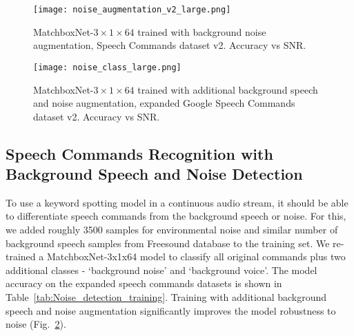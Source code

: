 \documentclass[a4paper]{article}
\begin{document}
\begin{figure}[ht!]
  \centering
  \texttt{[image: noise\_augmentation\_v2\_large.png]}
  \caption{MatchboxNet-$3\times1\times64$ trained with background noise augmentation, Speech Commands dataset v2. Accuracy vs SNR.}
  \label{fig:noise_augmentation_eval_v2}
\end{figure}

\begin{figure}[ht!]
  \centering
  \texttt{[image: noise\_class\_large.png]}
  \caption{MatchboxNet-$3\times1\times64$ trained with additional background speech and noise augmentation, expanded Google Speech Commands dataset v2. Accuracy vs SNR.}
  \label{fig:noise_detection_eval}
\end{figure}

\subsection{Speech Commands Recognition with Background Speech and Noise Detection}

To use a keyword spotting model in a continuous audio stream, it should be able to differentiate speech commands from the background speech or noise. For this,  we added roughly 3500 samples for environmental noise  and similar number of  background speech samples from Freesound database to the training set. We re-trained a MatchboxNet-3x1x64 model to classify all  original commands plus two additional classes - `background noise' and `background voice'. The model accuracy on the expanded speech commands datasets is shown in Table~\ref{tab:Noise_detection_training}. Training with additional background speech and noise augmentation significantly improves the model robustness to noise (Fig.~\ref{fig:noise_detection_eval}).

{\renewcommand{\arraystretch}{1.1}
\begin{table}[ht!]
\caption{MatchboxNet-$3\times1\times64$ trained with additional background speech and noise augmentation, expanded Speech Commands dataset. Accuracy (\%) is averaged over 5 trials (95\% confidence interval). }
\label{tab:Noise_detection_training}
\centering
{}
\end{table}
}
\end{document}
